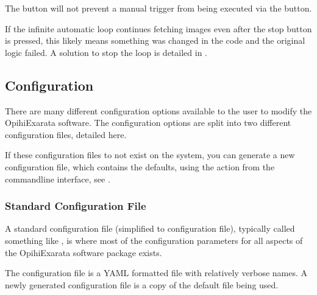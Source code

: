 \documentclass[letterpaper,11pt,english]{sphinxmanual}
\begin{document}
\sphinxAtStartPar
The  button will not prevent a manual trigger from being executed via
the  button.

\sphinxAtStartPar
If the infinite automatic loop continues fetching images even after the stop
button is pressed, this likely means something was changed in the code and
the original logic failed. A solution to stop the loop is detailed in
{\hyperref[\detokenize{user/troubleshooting:user-troubleshooting-automatic-mode-stop-button-not-working}]{}}.

\sphinxstepscope


\subsection{Configuration}
\label{\detokenize{user/configuration:configuration}}\label{\detokenize{user/configuration:user-configuration}}\label{\detokenize{user/configuration::doc}}
\sphinxAtStartPar
There are many different configuration options available to the user to
modify the OpihiExarata software. The configuration options are split into
two different configuration files, detailed here.

\sphinxAtStartPar
If these configuration files to not exist on the system, you can generate a
new configuration file, which contains the defaults, using the 
action from the command\sphinxhyphen{}line interface, see {\hyperref[\detokenize{user/command_line:user-command-line-available-actions-generate}]{}}.


\subsubsection{Standard Configuration File}
\label{\detokenize{user/configuration:standard-configuration-file}}\label{\detokenize{user/configuration:user-configuration-standard-configuration-file}}
\sphinxAtStartPar
A standard configuration file (simplified to configuration file), typically
called something like , is where most of the
configuration parameters for all aspects of the OpihiExarata software package
exists.

\sphinxAtStartPar
The configuration file is a YAML formatted file with relatively verbose names.
A newly generated configuration file is a copy of the default file being used.
\end{document}
